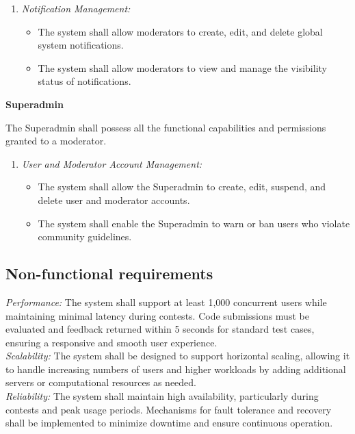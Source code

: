 \begin{enumerate}
    \item \textit{Notification Management:}
        \begin{itemize}
            \item The system shall allow moderators to create, edit, and delete global system notifications.
            \item The system shall allow moderators to view and manage the visibility status of notifications.
        \end{itemize}
\end{enumerate}
\vspace{0.3cm}
\noindent \textbf{\Large Superadmin}
\par\vspace{0.3cm}
The Superadmin shall possess all the functional capabilities and permissions granted to a moderator.
\begin{enumerate}
    \item \textit{User and Moderator Account Management:}
        \begin{itemize}
            \item The system shall allow the Superadmin to create, edit, suspend, and delete user and moderator accounts.
            \item The system shall enable the Superadmin to warn or ban users who violate community guidelines.
        \end{itemize}
\end{enumerate}

\subsection{Non-functional requirements}
\noindent \textit{Performance:} The system shall support at least 1,000 concurrent users while maintaining minimal latency during contests. Code submissions must be evaluated and feedback returned within 5 seconds for standard test cases, ensuring a responsive and smooth user experience.\\

\noindent \textit{Scalability:} The system shall be designed to support horizontal scaling, allowing it to handle increasing numbers of users and higher workloads by adding additional servers or computational resources as needed.\\

\noindent \textit{Reliability:} The system shall maintain high availability, particularly during contests and peak usage periods. Mechanisms for fault tolerance and recovery shall be implemented to minimize downtime and ensure continuous operation.\\

